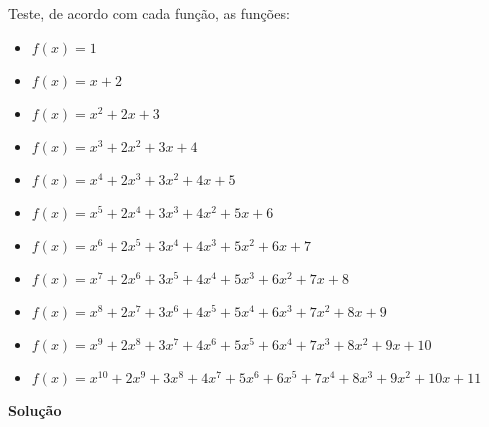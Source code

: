\documentclass[12pt, a4paper]{article}
\begin{document}
Teste, de acordo com cada função, as funções:

\begin{itemize}
	\item $f(x) = 1$
	\item $f(x) = x + 2$
	\item $f(x) = x^2 + 2x + 3$
	\item $f(x) = x^3 + 2x^2 + 3x + 4$
	\item $f(x) = x^4 + 2x^3 + 3x^2 + 4x + 5$
	\item $f(x) = x^5 + 2x^4 + 3x^3 + 4x^2 + 5x + 6$
	\item $f(x) = x^6 + 2x^5 + 3x^4 + 4x^3 + 5x^2 + 6x + 7$
	\item $f(x) = x^7 + 2x^6 + 3x^5 + 4x^4 + 5x^3 + 6x^2 + 7x + 8$
	\item $f(x) = x^8 + 2x^7 + 3x^6 + 4x^5 + 5x^4 + 6x^3 + 7x^2 + 8x + 9$
	\item $f(x) = x^9 + 2x^8 + 3x^7 + 4x^6 + 5x^5 + 6x^4 + 7x^3 + 8x^2 + 9x + 10$
	\item $f(x) = x^{10} + 2x^9 + 3x^8 + 4x^7 + 5x^6 + 6x^5 + 7x^4 + 8x^3 + 9x^2 + 10x + 11$
\end{itemize}

\textbf{Solução}
\end{document}
